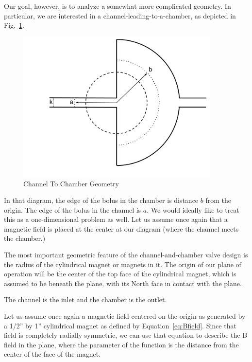 \documentclass[]{asme2ej}
\begin{document}
Our goal, however, is to analyze a somewhat more complicated geometry.
In particular, we are interested in a channel-leading-to-a-chamber,
as depicted in Fig.~\ref{fig:ChannelToChamber}.

\begin{figure}
\centerline{\includegraphics[width=4in]{figure/ChannelToChamber.png}}
\caption{Channel To Chamber Geometry}
\label{fig:ChannelToChamber}
\end{figure}

In that diagram, the edge of the bolus in the chamber is distance $b$ from the
origin. The edge of the bolus in the channel is $a$.
We would ideally like to treat this as a one-dimensional problem as well.
Let us assume once again that a magnetic field is placed at the center
at our diagram (where the channel meets the chamber.)

The most important geometric feature of the channel-and-chamber
valve design is the radius of the cylindrical magnet or magnets
in it. The origin of our plane of operation
will be the center of the top face of the cylindrical magnet,
which is assumed to be beneath the plane, with its North face
in contact with the plane.

The channel is the inlet and the chamber is the
outlet.

Let us assume once again a magnetic field centered on the origin as generated by a
1/2'' by 1'' cylindrical magnet as defined by Equation~\ref{eq:Bfield}.
Since that field is completely radially symmetric, we can use that equation to
describe the B field in the plane, where the parameter of the function
is the distance from the center of the face of the magnet.
\end{document}
